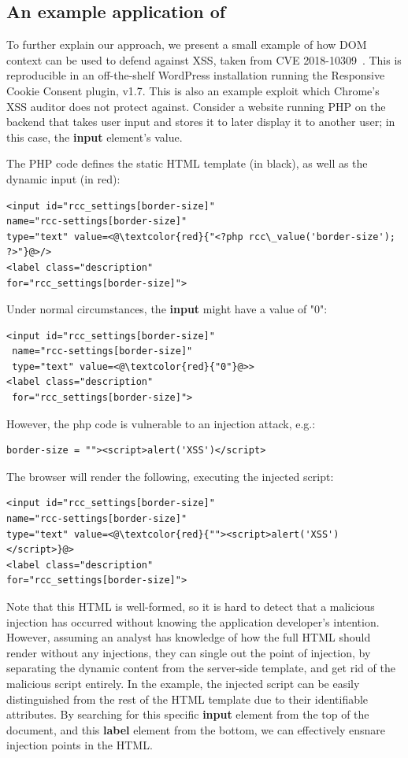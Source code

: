 \subsection{An example application of \sys} \label{motivating_example}

To further explain our approach, we present a small example of how
DOM context can be used to defend against XSS, taken from CVE
2018-10309~\cite{examplecve}. This is reproducible in an off-the-shelf
WordPress installation running the Responsive Cookie Consent plugin,
v1.7. This is also an example exploit which Chrome's XSS auditor does
not protect against. Consider a website running PHP on the backend
that takes user input and stores it to later display it to another
user; in this case, the \textbf{input} element's value.

The PHP code defines the static HTML template (in black), as well as the dynamic input (in red):

\begin{lstlisting}
<input id="rcc_settings[border-size]" 
name="rcc-settings[border-size]" 
type="text" value=<@\textcolor{red}{"<?php rcc\_value('border-size'); ?>"}@>/>
<label class="description"
for="rcc_settings[border-size]">
\end{lstlisting}
Under normal circumstances, the \textbf{input} might have a value of "0":
\begin{lstlisting}
<input id="rcc_settings[border-size]" 
 name="rcc-settings[border-size]" 
 type="text" value=<@\textcolor{red}{"0"}@>>
<label class="description"
 for="rcc_settings[border-size]">
\end{lstlisting}
However, the php code is vulnerable to an injection attack, e.g.:
\begin{lstlisting}
border-size = ""><script>alert('XSS')</script>
\end{lstlisting}
The browser will render the following, executing the injected script:
\begin{lstlisting}
<input id="rcc_settings[border-size]" 
name="rcc-settings[border-size]" 
type="text" value=<@\textcolor{red}{""><script>alert('XSS')</script>}@>
<label class="description"
for="rcc_settings[border-size]">
\end{lstlisting}

Note that this HTML is well-formed, so it is hard to detect that a malicious injection has occurred without knowing the application developer's intention. However, assuming an analyst has knowledge of how the full HTML should render without any injections, they can single out the point of injection, by separating the dynamic content from the server-side template, and get rid of the malicious script entirely. In the example, the injected script can be easily distinguished from the rest of the HTML template due to their identifiable attributes. By searching for this specific \textbf{input} element from the top of the document, and this \textbf{label} element from the bottom, we can effectively ensnare injection points in the HTML. 

